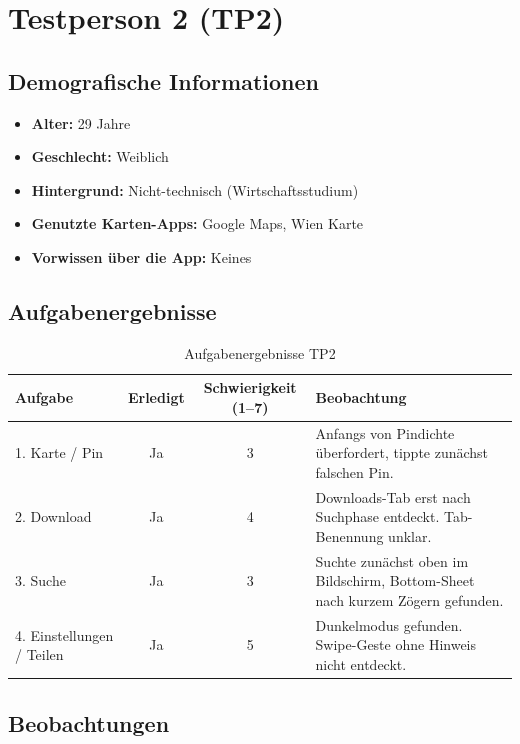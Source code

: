 \documentclass{article}
\begin{document}
\section{Testperson 2 (TP2)}

\subsection*{Demografische Informationen}
\begin{itemize}
    \item \textbf{Alter:} 29 Jahre
    \item \textbf{Geschlecht:} Weiblich
    \item \textbf{Hintergrund:} Nicht-technisch (Wirtschaftsstudium)
    \item \textbf{Genutzte Karten-Apps:} Google Maps, Wien Karte
    \item \textbf{Vorwissen über die App:} Keines
\end{itemize}

\subsection*{Aufgabenergebnisse}

\begin{table}[H]
    \centering
    \begin{tabular}{|l|c|c|p{7cm}|}
        \hline
        \textbf{Aufgabe} & \textbf{Erledigt} & \textbf{Schwierigkeit (1–7)} & \textbf{Beobachtung} \\
        \hline
        1. Karte / Pin & Ja & 3 & Anfangs von Pindichte überfordert, tippte zunächst falschen Pin. \\
        \hline
        2. Download & Ja & 4 & Downloads-Tab erst nach Suchphase entdeckt. Tab-Benennung unklar. \\
        \hline
        3. Suche & Ja & 3 & Suchte zunächst oben im Bildschirm, Bottom-Sheet nach kurzem Zögern gefunden. \\
        \hline
        4. Einstellungen / Teilen & Ja & 5 & Dunkelmodus gefunden. Swipe-Geste ohne Hinweis nicht entdeckt. \\
        \hline
    \end{tabular}
    \caption{Aufgabenergebnisse TP2}
\end{table}

\subsection*{Beobachtungen}
\end{document}
